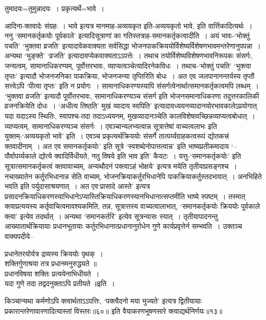 {{{{ तुमादयः=तुमुन्नादयः~।
प्रकृत्यर्थे=भावे~।

 आदिना-क्तवादेः संग्रहः~।
भावे इत्यत्र मानमाह-अव्ययकृत इति-अव्ययकृतो भावे, इति वार्त्तिकादित्यर्थः~।
ननु `समानकर्तृकयोः पूर्वकाले' इत्यादिसूत्राणां का गतिस्तत्राह-समानकर्तृकत्वादीति~।
अयं भावः-`भोक्तुं पचति' `भुक्तवा व्रजति' इत्यादावेकवाक्यता सर्वसिद्धा भोजनपाकक्रिययोर्विशेष्यर्विशेषणभावमन्तरेणानुपपन्ना~।
अन्यथा `भुङ्क्ते' `व्रजति' इत्यादावप्येकवाक्यताऽऽपत्तेः~।
तथाच तयोर्विशेष्यविशेषणभावनिरूपकः संसर्गः, जन्यत्वम्, सामानाधिकरण्यम्, पूर्वोत्तरभावः, व्याप्यत्वञ्चेत्यादिरनेकविधः~।
तथाच-`भोक्तुं पचति' `भुक्त्वा तृप्तः' इत्यादौ भोजनजनिका पाकक्रिया, भोजनजन्या तृप्तिरिति बोधः~।
अत एव जलपानानन्तर्यस्य तृप्तौ सत्त्वेऽपि `पीत्वा तृप्तः' इति न प्रयोगः~।
सामानाधिकरण्यस्यापि संसर्गत्वेनार्थात्समानकर्तृकत्वमपि लब्धम्~।
`भुक्तवा व्रजति' इत्यादौ पूर्वोत्तरभावः, सामानाधिकरण्यञ्च संसर्ग इति भोजनसमानाधिकरणा तदुत्तरकालिकी व्रजनक्रियेति दोधः~।
`अधीत्य तिष्ठति' मुखं व्यादाय स्वपिति' इत्यादावध्ययनव्यादानयोरभावकालेऽप्रयोगात् यदा यदाऽस्य स्थितिः, स्वापश्च-तदा तदाऽध्ययनम्, मुखव्यादानञ्चेति कालविशेषावच्छिन्नव्याप्यत्वबोधात्~।
व्याप्यत्वम्, सामानाधिकरण्यञ्च संसर्गः~।
 एवञ्चान्यलभ्यत्वान्न सूत्रात्तेषां वाच्यत्वलाभः इति युक्तम्-`अव्ययकृतो भावे' इति~।
एवञ्च प्रकृत्यर्थक्रिययोः संसर्गे तात्पर्य्यग्राहकत्वरूपं द्योतकत्त्रं क्तवादीनाम्~।
अत एव समानकर्तृकयोः' इति सूत्रे `स्वशब्देनोपात्तत्वान्न' इति भाष्यप्रतीकमादाय `--पौर्वापर्य्यकाले द्योत्ये क्वादिर्विधीयते, नतु विषये इति भाव इति' कैयटः~।
 यत्तु-`समानकर्तृकयोः' इति सूत्रात्समानकर्तृकत्वं क्तवावाच्यम्, अन्यथौदनं पक्त्वाऽहं भोक्षये' इत्यत्र मयेति तृतीयाप्रसङ्गश्च~।
नचाख्यातेन कर्तुरभिधानान्न सेति वाच्यम्, भोजनक्रियाकर्तुरभिधानेपि पाकक्रियाकर्तुस्तदभावात्~।
 अनभिहिते भवति इति पर्युदासाश्रयणात्~।
अत एव`प्रासादे आस्ते' इत्यत्र प्रसादनक्रियाधिकरणस्याभिधानेऽप्यास्तिक्रियाधिकरणस्यानभिधानात्सप्तमीति भाष्ये स्पष्टम्~।
तस्मात् क्त्वाप्रत्ययस्य कर्तृवाचित्वमावश्यकमिति, तन्न, सूत्रात्तस्य वाच्यत्वालाभात्, `समानकर्तृकयोः क्रिययोः पूर्वकाले क्त्वा' इत्येव तदर्थात्~।
अन्यथा `समानकर्तरि' इत्येव सूत्रन्यासः स्यात्~।
तृतीयापादनन्तु आख्यातार्थक्रियायाः प्रधानभूतायाः कर्तुरभिधानात्प्रधानानुरोधेन गुणे कार्यप्रवृत्तेर्न सम्भवति~।
उक्तञ्च वाक्यपदीये--
\begin{center} प्रधानेतरयोर्यत्र द्रव्यस्य क्रिययोः पृथक्~।\\
 शक्तिर्गुणाश्रया तत्र प्रधानमनुरुद्धयते ॥\\[10pt]
 प्रधानविषया शक्तिः प्रत्ययेनाभिधीयते~।\\
यदा गुणे तदा तद्वदनुक्ताऽपि प्रतीयते ॥इति~।\end{center}
 किञ्चान्यथा कर्मणोऽपि क्त्वार्थताऽऽपत्तिः, `पक्त्वैदनो मया भुज्यते' इत्यत्र द्वितीयायाः प्रकारान्तरेणावारणादित्यास्तां विस्तरः॥६०॥
 इति वैयाकरणभूषणसारे क्त्वाद्यर्थनिर्णयः॥१३॥

}}}}
